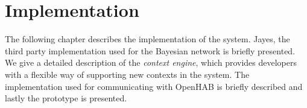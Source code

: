 \chapter{Implementation}
\label{chap:implementation}

The following chapter describes the implementation of the system. Jayes, the third party implementation used for the Bayesian network is briefly presented. We give a detailed description of the \emph{context engine}, which provides developers with a flexible way of supporting new contexts in the system. The implementation used for communicating with OpenHAB is briefly described and lastly the prototype is presented.



% 







